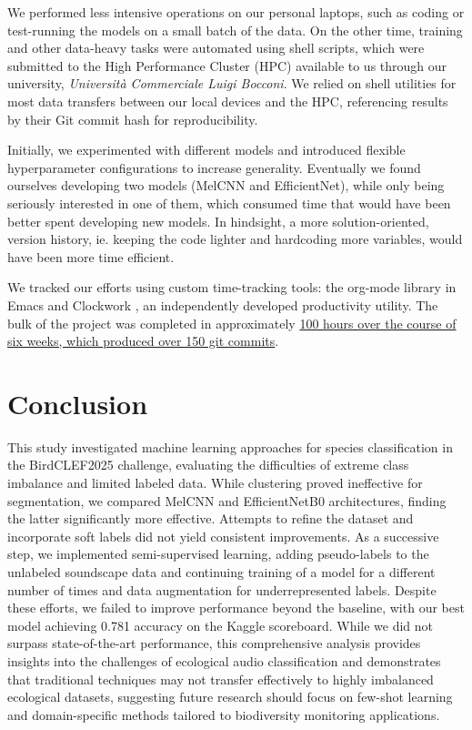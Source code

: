 \documentclass[11pt]{article}
\begin{document}
We performed less intensive operations on our personal laptops, such as coding or test-running the models on a small batch of the data. On the other time, training and other data-heavy tasks were automated using shell scripts, which were submitted to the High Performance Cluster (HPC) available to us through our university, \textit{Università Commerciale Luigi Bocconi}\cite{unibocconi}. We relied on shell utilities for most data transfers between our local devices and the HPC, referencing results by their Git commit hash for reproducibility.

Initially, we experimented with different models and introduced flexible hyperparameter configurations to increase generality. Eventually we found ourselves developing two models (MelCNN and EfficientNet), while only being seriously interested in one of them, which consumed time that would have been better spent developing new models. In hindsight, a more solution-oriented, version history, ie. keeping the code lighter and hardcoding more variables, would have been more time efficient.

We tracked our efforts using custom time-tracking tools: the org-mode library \cite{doom_emacs} in Emacs \cite{gnu_emacs} and Clockwork \cite{clockwork}, an independently developed productivity utility. The bulk of the project was completed in approximately \underline{100 hours over the course of six weeks, which produced over 150 git commits}.

\section*{Conclusion}
This study investigated machine learning approaches for species classification in the BirdCLEF2025 challenge, evaluating the difficulties of extreme class imbalance and limited labeled data. While clustering proved ineffective for segmentation, we compared MelCNN and EfficientNetB0 architectures, finding the latter significantly more effective. Attempts to refine the dataset and incorporate soft labels did not yield consistent improvements. As a successive step, we implemented semi-supervised learning, adding pseudo-labels to the unlabeled soundscape data and continuing training of a model for a different number of times and data augmentation for underrepresented labels. Despite these efforts, we failed to improve performance beyond the baseline, with our best model achieving 0.781 accuracy on the Kaggle scoreboard. While we did not surpass state-of-the-art performance, this comprehensive analysis provides insights into the challenges of ecological audio classification and demonstrates that traditional techniques may not transfer effectively to highly imbalanced ecological datasets, suggesting future research should focus on few-shot learning and domain-specific methods tailored to biodiversity monitoring applications.
\end{document}
